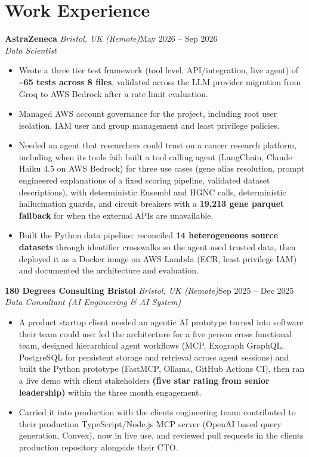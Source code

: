 \documentclass[a4paper,11pt]{article}
\newcommand{\role}[4]{%
  \textbf{#1}{\color{muted}\,\textperiodcentered\,\textit{#2}}\hfill{\color{muted}#3}\\
  \textit{#4}\par}
\newcommand{\gap}{\vspace{5pt}}
\newcommand{\num}[1]{\textbf{#1}}   %
\begin{document}
\section{Work Experience}
\role{AstraZeneca}{Bristol, UK (Remote)}{May 2026 – Sep 2026}{Data Scientist}
\begin{itemize}
  \item Wrote a three tier test framework (tool level, API/integration, live agent) of \num{\textasciitilde{}65 tests across 8 files}, validated across the LLM provider migration from Groq to AWS Bedrock after a rate limit evaluation.
  \item Managed AWS account governance for the project, including root user isolation, IAM user and group management and least privilege policies.
  \item Needed an agent that researchers could trust on a cancer research platform, including when its tools fail: built a tool calling agent (LangChain, Claude Haiku 4.5 on AWS Bedrock) for three use cases (gene alias resolution, prompt engineered explanations of a fixed scoring pipeline, validated dataset descriptions), with deterministic Ensembl and HGNC calls, deterministic hallucination guards, and circuit breakers with a \num{19,213 gene parquet fallback} for when the external APIs are unavailable.
  \item Built the Python data pipeline: reconciled \num{14 heterogeneous source datasets} through identifier crosswalks so the agent used trusted data, then deployed it as a Docker image on AWS Lambda (ECR, least privilege IAM) and documented the architecture and evaluation.
\end{itemize}
\gap
{}
\role{180 Degrees Consulting Bristol}{Bristol, UK (Remote)}{Sep 2025 – Dec 2025}{Data Consultant (AI Engineering \& AI System)}
\begin{itemize}
  \item A product startup client needed an agentic AI prototype turned into software their team could use: led the architecture for a five person cross functional team, designed hierarchical agent workflows (MCP, Exograph GraphQL, PostgreSQL for persistent storage and retrieval across agent sessions) and built the Python prototype (FastMCP, Ollama, GitHub Actions CI), then ran a live demo with client stakeholders \num{(five star rating from senior leadership)} within the three month engagement.
  \item Carried it into production with the client\textquotesingle{}s engineering team: contributed to their production TypeScript/Node.js MCP server (OpenAI based query generation, Convex), now in live use, and reviewed pull requests in the client\textquotesingle{}s production repository alongside their CTO.
\end{itemize}
\end{document}
